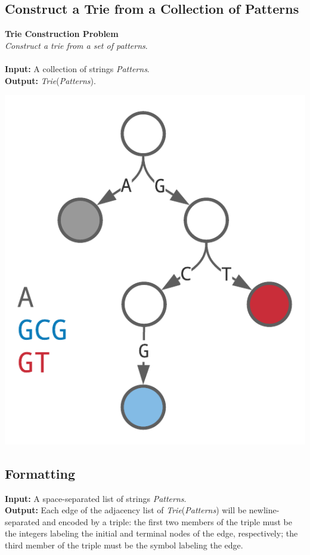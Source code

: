 \documentclass{article}
\begin{document}
\subsection{Construct a Trie from a Collection of Patterns} 
\hline \vspace{5}
\textbf{Trie Construction Problem}\\
\emph{Construct a trie from a set of patterns}.\\ \\
\textbf{Input:} A collection of strings \emph{Patterns}.\\
\textbf{Output:} \emph{Trie}(\emph{Patterns}).
\begin{center}
    \includegraphics[scale=0.2]{logos/9A.png}
\end{center}
\hline\vspace{5}

\subsection*{Formatting}
\noindent\textbf{Input:} A space-separated list of strings \emph{Patterns}.\\
\noindent\textbf{Output:} Each edge of the adjacency list of \emph{Trie}(\emph{Patterns}) will be newline-separated and encoded by a triple: the first two members of the triple must be the integers labeling the initial and terminal nodes of the edge, respectively; the third member of the triple must be the symbol labeling the edge.
\end{document}
